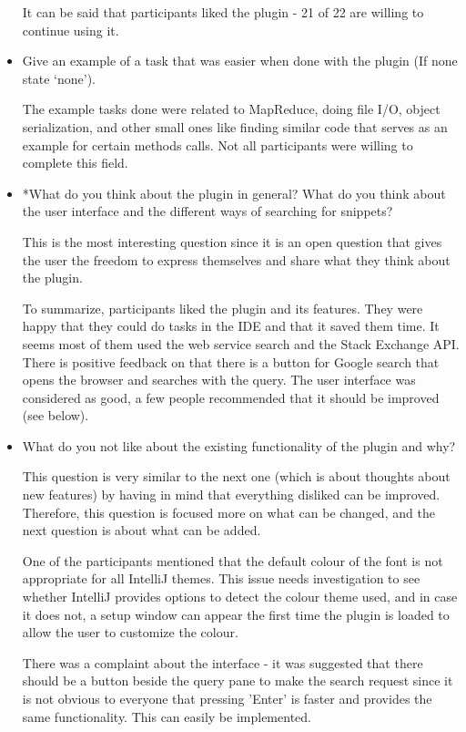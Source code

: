 \documentclass{l4proj}
\begin{document}
\begin{itemize}
It can be said that participants liked the plugin - 21 of 22 are willing to continue using it.

\item Give an example of a task that was easier when done with the plugin (If none state ‘none’).

The example tasks done were related to MapReduce, doing file I/O, object serialization, and other small ones like finding similar code that serves as an example for certain methods calls. Not all participants were willing to complete this field.

\item *What do you think about the plugin in general? What do you think about the user interface and the different ways of searching for snippets?

This is the most interesting question since it is an open question that gives the user the freedom to express themselves and share what they think about the plugin. 

To summarize, participants liked the plugin and its features. They were happy that they could do tasks in the IDE and that it saved them time. It seems most of them used the web service search and the Stack Exchange API. There is positive feedback on that there is a button for Google search that opens the browser and searches with the query. The user interface was considered as good, a few people recommended that it should be improved (see below).

\item What do you not like about the existing functionality of the plugin and why?

This question is very similar to the next one (which is about thoughts about new features) by having in mind that everything disliked can be improved. Therefore, this question is focused more on what can be changed, and the next question is about what can be added.

One of the participants mentioned that the default colour of the font is not appropriate for all IntelliJ themes. This issue needs investigation to see whether IntelliJ provides options to detect the colour theme used, and in case it does not, a setup window can appear the first time the plugin is loaded to allow the user to customize the colour. 

There was a complaint about the interface - it was suggested that there should be a button beside the query pane to make the search request since it is not obvious to everyone that pressing 'Enter' is faster and provides the same functionality. This can easily be implemented.


\end{itemize}
\end{document}
